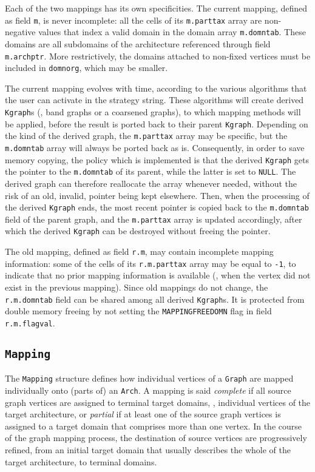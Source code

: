 Each of the two mappings has its own specificities. The current
mapping, defined as field \texttt{m}, is never incomplete: all the
cells of its \texttt{m.parttax} array are non-negative values that index
a valid domain in the domain array \texttt{m.domntab}. These domains
are all subdomains of the architecture referenced through field
\texttt{m.archptr}. More restrictively, the domains attached to
non-fixed vertices must be included in \texttt{domnorg}, which may be
smaller.

The current mapping evolves with time, according to the various
algorithms that the user can activate in the strategy string. These
algorithms will create derived \texttt{Kgraph}s (\eg, band graphs or a
coarsened graphs), to which mapping methods will be applied, before
the result is ported back to their parent \texttt{Kgraph}. Depending
on the kind of the derived graph, the \texttt{m.parttax} array may be
specific, but the \texttt{m.domntab} array will always be ported back
as is. Consequently, in order to save memory copying, the policy which
is implemented is that the derived \texttt{Kgraph} gets the pointer to
the \texttt{m.domntab} of its parent, while the latter is set to
\texttt{NULL}. The derived graph can therefore reallocate the array
whenever needed, without the risk of an old, invalid, pointer being
kept elsewhere. Then, when the processing of the derived
\texttt{Kgraph} ends, the most recent pointer is copied back to the
\texttt{m.domntab} field of the parent graph, and the
\texttt{m.parttax} array is updated accordingly, after which the
derived \texttt{Kgraph} can be destroyed without freeing the
pointer.

The old mapping, defined as field \texttt{r.m},
may contain incomplete mapping information: some of the cells of its
\texttt{r.m.parttax} array may be equal to \texttt{-1}, to indicate
that no prior mapping information is available (\eg, when the vertex
did not exist in the previous mapping). Since old mappings do not
change, the \texttt{r.m.domntab} field can be shared among all derived
\texttt{Kgraph}s. It is protected from double memory freeing by not
setting the \texttt{MAPPING\lbt FREE\lbt DOMN} flag in field
\texttt{r.m.flagval}.

\subsection{\texttt{Mapping}}
\label{sec-data-mapping}

The \texttt{Mapping} structure defines how individual vertices of a
\texttt{Graph} are mapped individually onto (parts of) an
\texttt{Arch}. A mapping is said \textit{complete} if all source graph
vertices are assigned to terminal target domains, \ie, individual
vertices of the target architecture, or \textit{partial} if at least
one of the source graph vertices is assigned to a target domain that
comprises more than one vertex. In the course of the graph mapping
process, the destination of source vertices are progressively refined,
from an initial target domain that usually describes the whole of the
target architecture, to terminal domains.

